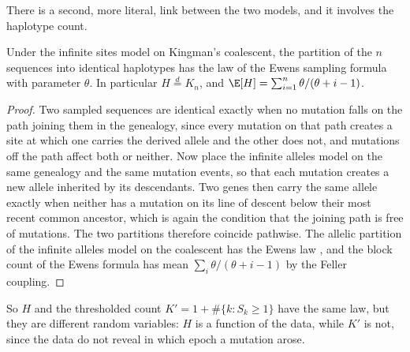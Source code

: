 There is a second, more literal, link between the two models, and it involves the haplotype count.

\begin{proposition}\label{coal:prop:hapewens}
Under the infinite sites model on Kingman's coalescent, the partition of the $n$ sequences into identical haplotypes has the law of the Ewens sampling formula with parameter $\theta$. In particular $H\overset{d}{=}K_n$, and $\E[H]=\sum_{i=1}^n\theta/(\theta+i-1)$.
\end{proposition}

\begin{proof}
Two sampled sequences are identical exactly when no mutation falls on the path joining them in the genealogy, since every mutation on that path creates a site at which one carries the derived allele and the other does not, and mutations off the path affect both or neither. Now place the infinite alleles model on the same genealogy and the same mutation events, so that each mutation creates a new allele inherited by its descendants. Two genes then carry the same allele exactly when neither has a mutation on its line of descent below their most recent common ancestor, which is again the condition that the joining path is free of mutations. The two partitions therefore coincide pathwise. The allelic partition of the infinite alleles model on the coalescent has the Ewens law \citep{coal:ewens1972,coal:kingman1982}, and the block count of the Ewens formula has mean $\sum_i\theta/(\theta+i-1)$ by the Feller coupling.
\end{proof}

So $H$ and the thresholded count $K'=1+\#\{k:S_k\ge1\}$ have the same law, but they are different random variables: $H$ is a function of the data, while $K'$ is not, since the data do not reveal in which epoch a mutation arose.

